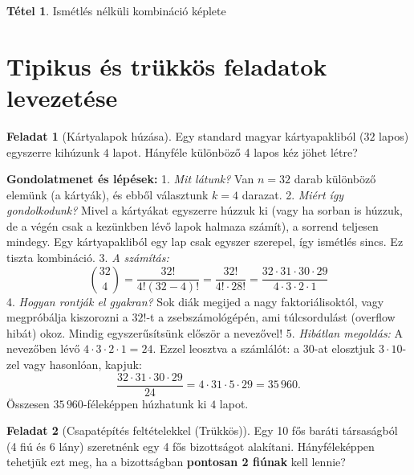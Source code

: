 \documentclass[a4paper,12pt]{article}
\theoremstyle{definition} %
\newtheorem*{theorem}{Tétel}
\newtheorem*{problem}{Feladat}
\begin{document}
\begin{theorem}{Ismétlés nélküli kombináció képlete}
\section{Tipikus és trükkös feladatok levezetése}

\begin{problem}[Kártyalapok húzása]
Egy standard magyar kártyapakliból ($32$ lapos) egyszerre kihúzunk $4$ lapot. Hányféle különböző 4 lapos kéz jöhet létre?
\end{problem}

\textbf{Gondolatmenet és lépések:}
1. \textit{Mit látunk?} Van $n = 32$ darab különböző elemünk (a kártyák), és ebből választunk $k = 4$ darazat.
2. \textit{Miért így gondolkodunk?} Mivel a kártyákat egyszerre húzzuk ki (vagy ha sorban is húzzuk, de a végén csak a kezünkben lévő lapok halmaza számít), a sorrend teljesen mindegy. Egy kártyapakliból egy lap csak egyszer szerepel, így ismétlés sincs. Ez tiszta kombináció.
3. \textit{A számítás:}
$$\binom{32}{4} = \frac{32!}{4!(32-4)!} = \frac{32!}{4! \cdot 28!} = \frac{32 \cdot 31 \cdot 30 \cdot 29}{4 \cdot 3 \cdot 2 \cdot 1}$$
4. \textit{Hogyan rontják el gyakran?} Sok diák megijed a nagy faktoriálisoktól, vagy megpróbálja kiszorozni a $32!$-t a zsebszámológépén, ami túlcsordulást (overflow hibát) okoz. Mindig egyszerűsítsünk először a nevezővel!
5. \textit{Hibátlan megoldás:} 
A nevezőben lévő $4 \cdot 3 \cdot 2 \cdot 1 = 24$. Ezzel leosztva a számlálót: a $30$-at elosztjuk $3 \cdot 10$-zel vagy hasonlóan, kapjuk:
$$\frac{32 \cdot 31 \cdot 30 \cdot 29}{24} = 4 \cdot 31 \cdot 5 \cdot 29 = 35\,960.$$
Összesen $35\,960$-féleképpen húzhatunk ki $4$ lapot.

\vspace{1em}

\begin{problem}[Csapatépítés feltételekkel (Trükkös)]
Egy 10 fős baráti társaságból (4 fiú és 6 lány) szeretnénk egy 4 fős bizottságot alakítani. Hányféleképpen tehetjük ezt meg, ha a bizottságban \textbf{pontosan 2 fiúnak} kell lennie?
\end{problem}


\end{theorem}
\end{document}
